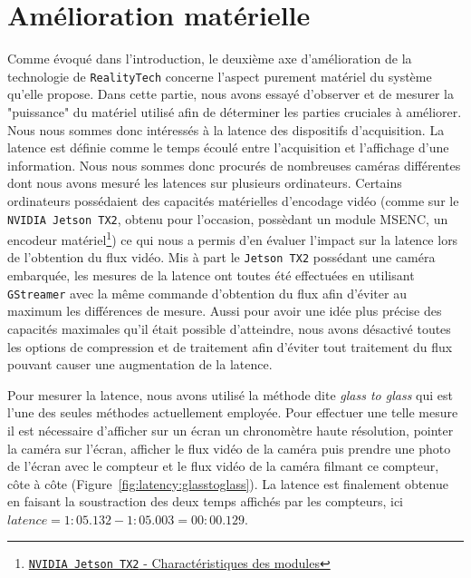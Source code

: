 \newpage
\section{Amélioration matérielle}
\label{sec:hardwareup}
Comme évoqué dans l'introduction, le deuxième axe d'amélioration de la technologie de \texttt{RealityTech} concerne l'aspect purement matériel du système qu'elle propose. Dans cette partie, nous avons essayé d'observer et de mesurer la "puissance" du matériel utilisé afin de déterminer les parties cruciales à améliorer.\\

Nous nous sommes donc intéressés à la latence des dispositifs d'acquisition. La latence est définie comme le temps écoulé entre l'acquisition et l'affichage d'une information. 
Nous nous sommes donc procurés de nombreuses caméras différentes dont nous avons mesuré les latences sur plusieurs ordinateurs. Certains ordinateurs possédaient des capacités matérielles d'encodage vidéo (comme sur le \texttt{NVIDIA Jetson TX2}, obtenu pour l'occasion, possèdant un module MSENC, un encodeur matériel\footnote{\href{https://www.nvidia.fr/autonomous-machines/embedded-systems-dev-kits-modules/}{\texttt{NVIDIA Jetson TX2} - Charactéristiques des modules}}) ce qui nous a permis d'en évaluer l'impact sur la latence lors de l'obtention du flux vidéo. Mis à part le \texttt{Jetson TX2} possédant une caméra embarquée, les mesures de la latence ont toutes été effectuées en utilisant \texttt{GStreamer}\cite{gstreamer} avec la même commande d'obtention du flux afin d'éviter au maximum les différences de mesure. Aussi pour avoir une idée plus précise des capacités maximales qu'il était possible d'atteindre, nous avons désactivé toutes les options de compression et de traitement afin d'éviter tout traitement du flux pouvant causer une augmentation de la latence.

Pour mesurer la latence, nous avons utilisé la méthode dite \emph{glass to glass}\cite{glasstoglass} qui est l'une des seules méthodes actuellement employée. Pour effectuer une telle mesure il est nécessaire d'afficher sur un écran un chronomètre haute résolution, pointer la caméra sur l'écran, afficher le flux vidéo de la caméra puis prendre une photo de l'écran avec le compteur et le flux vidéo de la caméra filmant ce compteur, côte à côte (Figure~\ref{fig:latency:glasstoglass}). La latence est finalement obtenue en faisant la soustraction des deux temps affichés par les compteurs, ici $latence = 1:05.132 - 1:05.003 = 00:00.129$.

